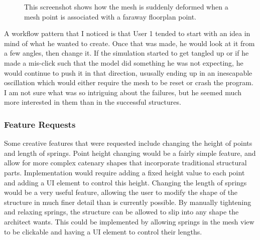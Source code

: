 \documentclass{thesis}
\begin{document}
\begin{figure}
\caption[Snapping]{This screenshot shows how the mesh is suddenly deformed when a mesh point is associated with a faraway
floorplan point.}
\label{fig:snapping}
\end{figure}

A workflow pattern that I noticed is that User 1 tended to start with an idea in mind of what he wanted to create.  Once that was made,
he would look at it from a few angles, then change it.  If the simulation started to get tangled up or if he made a mis-click
such that the model did something he was not expecting, he would continue to push it in that direction, ususally ending up in an
inescapable oscillation which would either require the mesh to be reset or crash the program.  I am not sure what was so intriguing
about the failures, but he seemed much more interested in them than in the successful structures.

\subsubsection{Feature Requests}
Some creative features that were requested include changing the height of points and length of springs.  Point height changing
would be a fairly simple feature, and allow for more complex catenary shapes that incorporate traditional structural parts.
Implementation would require adding a fixed height value to each point and adding a UI element to control this height.
Changing the length of springs would be a very useful feature, allowing the user to modify the shape of the structure in much
finer detail than is currently possible.  By manually tightening and relaxing springs, the structure can be allowed to slip into
any shape the architect wants.  This could be implemented by allowing springs in the mesh view to be clickable and having a UI
element to control their lengths.
\end{document}
